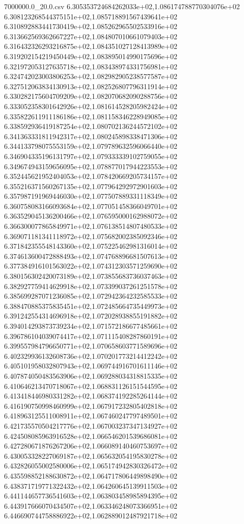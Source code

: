 \begin{filecontents*}{7000000.0_20.0.csv}
6.305353724684262033e+02,1.086174788770304076e+02
6.308123268544375151e+02,1.085718891567439641e+02
6.310892883441730419e+02,1.085262965502533916e+02
6.313662569362667227e+02,1.084807010661079403e+02
6.316432326293216875e+02,1.084351027128413989e+02
6.319202154219450449e+02,1.083895014990175696e+02
6.321972053127635718e+02,1.083438974331756981e+02
6.324742023003806253e+02,1.082982905238577587e+02
6.327512063834130913e+02,1.082526807796311914e+02
6.330282175604709209e+02,1.082070682090288756e+02
6.333052358301642926e+02,1.081614528205982424e+02
6.335822611911186186e+02,1.081158346228949085e+02
6.338592936419187254e+02,1.080702136244572102e+02
6.341363331811942317e+02,1.080245898338471306e+02
6.344133798075553159e+02,1.079789632596066440e+02
6.346904335196131797e+02,1.079333339102759055e+02
6.349674943159656095e+02,1.078877017944223553e+02
6.352445621952404053e+02,1.078420669205734157e+02
6.355216371560267135e+02,1.077964292972901603e+02
6.357987191969446030e+02,1.077507889331118349e+02
6.360758083166093684e+02,1.077051458366049701e+02
6.363529045136200466e+02,1.076595000162988072e+02
6.366300077865849971e+02,1.076138514807480533e+02
6.369071181341118972e+02,1.075682002385092346e+02
6.371842355548143360e+02,1.075225462981316014e+02
6.374613600472888493e+02,1.074768896681507613e+02
6.377384916101563022e+02,1.074312303571259690e+02
6.380156302420073189e+02,1.073855683736037463e+02
6.382927759414629918e+02,1.073399037261251578e+02
6.385699287071236085e+02,1.072942364232585533e+02
6.388470885375835451e+02,1.072485664735449973e+02
6.391242554314696918e+02,1.072028938855191882e+02
6.394014293873739234e+02,1.071572186677485661e+02
6.396786104039074417e+02,1.071115408287860191e+02
6.399557984796650771e+02,1.070658603771589696e+02
6.402329936132608736e+02,1.070201773214412242e+02
6.405101958032807943e+02,1.069744916701611146e+02
6.407874050483563906e+02,1.069288034318815335e+02
6.410646213470718067e+02,1.068831126151544595e+02
6.413418446980331282e+02,1.068374192285264144e+02
6.416190750998460999e+02,1.067917232805402818e+02
6.418963125511008911e+02,1.067460247797489501e+02
6.421735570504217776e+02,1.067003237347134927e+02
6.424508085963916528e+02,1.066546201539686081e+02
6.427280671876267206e+02,1.066089140460753697e+02
6.430053328227069187e+02,1.065632054195830278e+02
6.432826055002580006e+02,1.065174942830326472e+02
6.435598852188630872e+02,1.064717806449898490e+02
6.438371719771322432e+02,1.064260645139911503e+02
6.441144657736541603e+02,1.063803458985894395e+02
6.443917666070434507e+02,1.063346248073366951e+02
6.446690744758886922e+02,1.062889012487921718e+02

\end{filecontents*}
